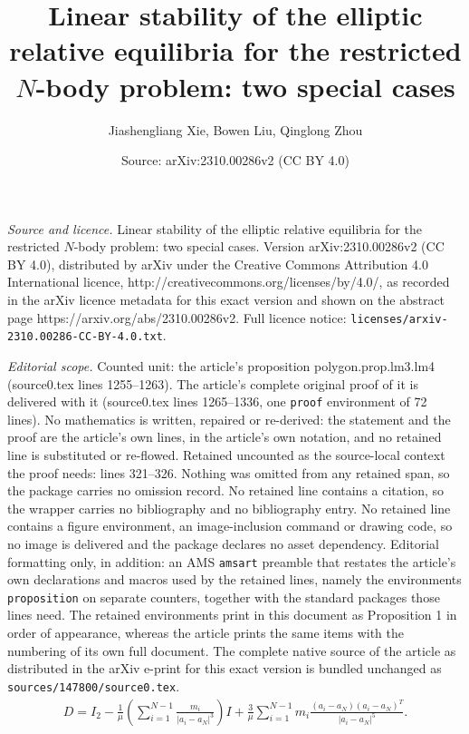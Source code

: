 \documentclass[10pt,a4paper]{amsart}
\title{Linear stability of the elliptic relative equilibria for the restricted $N$-body problem: two special cases}
\author{Jiashengliang Xie, Bowen Liu, Qinglong Zhou}
\date{Source: arXiv:2310.00286v2 (CC BY 4.0)}
\begin{document}
\maketitle

\noindent\emph{Source and licence.} Linear stability of the elliptic relative equilibria for the restricted $N$-body problem: two special cases. Version arXiv:2310.00286v2 (CC BY 4.0), distributed by arXiv under the Creative Commons Attribution 4.0 International licence, http://creativecommons.org/licenses/by/4.0/, as recorded in the arXiv licence metadata for this exact version and shown on the abstract page https://arxiv.org/abs/2310.00286v2. Full licence notice: \texttt{licenses/arxiv-2310.00286-CC-BY-4.0.txt}.\par\smallskip

\noindent\textit{Editorial scope.} Counted unit: the article's proposition polygon.prop.lm3.lm4 (source0.tex lines 1255--1263). The article's complete original proof of it is delivered with it (source0.tex lines 1265--1336, one \texttt{proof} environment of 72 lines). No mathematics is written, repaired or re-derived: the statement and the proof are the article's own lines, in the article's own notation, and no retained line is substituted or re-flowed.  Retained uncounted as the source-local context the proof needs: lines 321--326.  Nothing was omitted from any retained span, so the package carries no omission record.  No retained line contains a citation, so the wrapper carries no bibliography and no bibliography entry.  No retained line contains a figure environment, an image-inclusion command or drawing code, so no image is delivered and the package declares no asset dependency.  Editorial formatting only, in addition: an AMS \texttt{amsart} preamble that restates the article's own declarations and macros used by the retained lines, namely the environments \texttt{proposition} on separate counters, together with the standard packages those lines need.  The retained environments print in this document as Proposition 1 in order of appearance, whereas the article prints the same items with the numbering of its own full document.  The complete native source of the article as distributed in the arXiv e-print for this exact version is bundled unchanged as \texttt{sources/147800/source0.tex}.
  \begin{align}
    \label{matrix.D}
  D=I_2-\frac{1}{\mu}\left(\sum_{i=1}^{N-1}
  \frac{m_i}{|a_i-a_{N}|^3}\right)I
  +\frac{3}{\mu}\sum_{i=1}^{N-1} m_i\frac{(a_i-a_{N})(a_i-a_{N})^T}{|a_i-a_{N}|^5}.
  \end{align}
\end{document}
